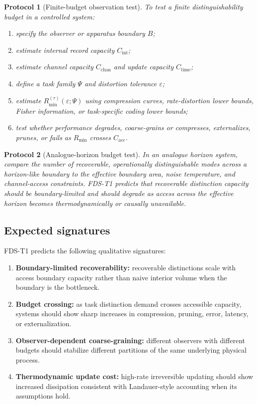 \documentclass[10pt,a4paper,twocolumn,aps,prl]{revtex4-2}
\newtheorem{protocol}{Protocol}
\begin{document}
\begin{protocol}[Finite-budget observation test]
To test a finite distinguishability budget in a controlled system:
\begin{enumerate}
    \item specify the observer or apparatus boundary $B$;
    \item estimate internal record capacity $C_{\mathrm{int}}$;
    \item estimate channel capacity $C_{\mathrm{chan}}$ and update capacity $C_{\mathrm{time}}$;
    \item define a task family $\Psi$ and distortion tolerance $\varepsilon$;
    \item estimate $R_{\min}^{(\tau)}(\varepsilon;\Psi)$ using compression curves, rate-distortion lower bounds, Fisher information, or task-specific coding lower bounds;
    \item test whether performance degrades, coarse-grains or compresses, externalizes, prunes, or fails as $R_{\min}$ crosses $C_{\mathrm{acc}}$.
\end{enumerate}
\end{protocol}

\begin{protocol}[Analogue-horizon budget test]
In an analogue horizon system, compare the number of recoverable, operationally distinguishable modes across a horizon-like boundary to the effective boundary area, noise temperature, and channel-access constraints. FDS-T1 predicts that recoverable distinction capacity should be boundary-limited and should degrade as access across the effective horizon becomes thermodynamically or causally unavailable.
\end{protocol}

\subsection{Expected signatures}

FDS-T1 predicts the following qualitative signatures:

\begin{enumerate}
    \item \textbf{Boundary-limited recoverability:} recoverable distinctions scale with access boundary capacity rather than naive interior volume when the boundary is the bottleneck.
    \item \textbf{Budget crossing:} as task distinction demand crosses accessible capacity, systems should show sharp increases in compression, pruning, error, latency, or externalization.
    \item \textbf{Observer-dependent coarse-graining:} different observers with different budgets should stabilize different partitions of the same underlying physical process.
    \item \textbf{Thermodynamic update cost:} high-rate irreversible updating should show increased dissipation consistent with Landauer-style accounting when its assumptions hold.
\end{enumerate}
\end{document}
